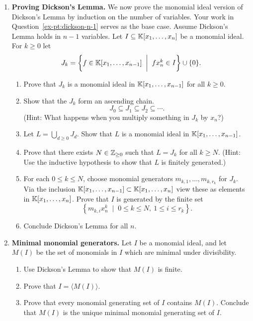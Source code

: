 \documentclass[12pt,reqno]{amsart}
\begin{document}
\begin{enumerate}[leftmargin=*]
\item \textbf{Proving Dickson's Lemma.} We now prove the monomial ideal version of Dickson's Lemma by induction on the number of variables. Your work in Question~\ref{ex-pt:dickson-n-1} serves as the base case. Assume Dickson's Lemma holds in $n-1$ variables. Let $I\subseteq \mathbb{K}[x_1,\ldots,x_n]$ be a monomial ideal. For  $k \geq 0$ let
\[
J_k=\left\{f \in \mathbb{K}[x_1,\ldots,x_{n-1}]\;\; \bigg| \;\; \begin{matrix} fx_n^k\in I \end{matrix} \right\} \cup \{0\}.
\]
\begin{enumerate}[label=(\alph*),ref=\theenumi\alph*]
	\item Prove that $J_{k}$ is a monomial ideal in $\mathbb{K}[x_1,\ldots,x_{n-1}]$ for all $k\geq 0$.
    	\item Show that the $J_{k}$ form an ascending chain. 
    	\[
    	J_0\subseteq J_1\subseteq J_2\subseteq \cdots.
    	\]
    	(Hint: What happens when you multiply something in $J_{k}$ by $x_n$?)
	
    	\item Let $L=\bigcup_{d\geq 0} J_d$. Show that $L$ is a monomial ideal in $\mathbb{K}[x_1,\ldots,x_{n-1}]$.
    
    \item Prove that there exists $N \in \mathbb{Z}_{\geq0}$ such that $L = J_{k}$ for all $k\geq N$. (Hint: Use the inductive hypothesis to show that $L$ is finitely generated.)
    
    \item For each $0\leq k\leq N$, choose monomial generators $m_{k,1},\ldots,m_{k,r_k}$ for $J_k$. Via the inclusion $\mathbb{K}[x_1,\ldots,x_{n-1}] \subset \mathbb{K}[x_1,\ldots,x_n]$ view these as elements in $\mathbb{K}[x_1,\ldots,x_n]$. Prove that $I$ is generated by the finite set
    \[
    \left \{m_{k, i}x_n^k \; \; \big| \; \;  0\leq k \leq N,\ 1\leq i \leq r_k \right\}.
    \]
    
    \item Conclude Dickson's Lemma for all $n$.
\end{enumerate}

\item \textbf{Minimal monomial generators.} Let $I$ be a monomial ideal, and let $M(I)$ be the set of monomials in $I$ which are minimal under divisibility.
\begin{enumerate}[label=(\alph*),ref=\theenumi\alph*]
    \item Use Dickson's Lemma to show that $M(I)$ is finite.
    
    \item Prove that $I=\langle M(I)\rangle$.
    
    \item Prove that every monomial generating set of $I$ contains $M(I)$. Conclude that $M(I)$ is the unique minimal monomial generating set of $I$.
\end{enumerate}
\end{enumerate}
\end{document}
